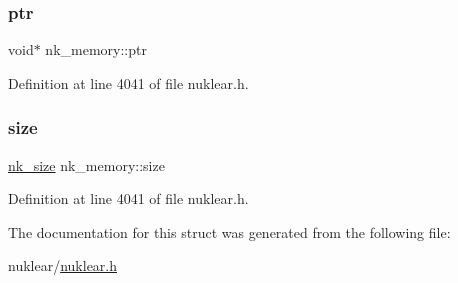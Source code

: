 \subsubsection{\texorpdfstring{ptr}{ptr}}
{\footnotesize\ttfamily void$\ast$ nk\+\_\+memory\+::ptr}



Definition at line 4041 of file nuklear.\+h.

\mbox{\label{structnk__memory_a02e6260408d501c5c06c6a73189b5e23}} 
\subsubsection{\texorpdfstring{size}{size}}
{\footnotesize\ttfamily \mbox{\hyperlink{nuklear_8h_a84c0fc50dec5501be327b33d41d9010c}{nk\+\_\+size}} nk\+\_\+memory\+::size}



Definition at line 4041 of file nuklear.\+h.



The documentation for this struct was generated from the following file\+:\begin{DoxyCompactItemize}
\item 
nuklear/\mbox{\hyperlink{nuklear_8h}{nuklear.\+h}}\end{DoxyCompactItemize}
